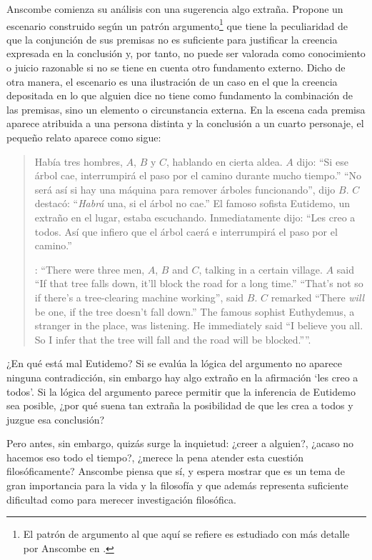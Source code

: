 Anscombe comienza su análisis con una sugerencia algo extraña. Propone un escenario construido según un patrón argumento\footnote{El patrón de argumento al que aquí se refiere es estudiado con más detalle por Anscombe en \cite{anscombe2015logic:qpa}.} que tiene la peculiaridad de que la conjunción de sus premisas no es suficiente para justificar la creencia expresada en la conclusión y, por tanto, no puede ser valorada como conocimiento o juicio razonable si no se tiene en cuenta otro fundamento externo. Dicho de otra manera, el escenario es una ilustración de un caso en el que la creencia depositada en lo que alguien dice no tiene como fundamento la combinación de las premisas, sino un elemento o circunstancia externa. En la escena cada premisa aparece atribuida a una persona distinta y la conclusión a un cuarto personaje, el pequeño relato aparece como sigue: \blockquote[{\Cite[1]{anscombe2008faith:tobelieve}}: \enquote{There were three men, $A$, $B$ and $C$, talking in a certain village. $A$ said ``If that tree falls down, it'll block the road for a long time.'' ``That's not so if there's a tree-clearing machine working'', said $B$. $C$ remarked ``There \emph{will} be one, if the tree doesn't fall down.'' The famous sophist Euthydemus, a stranger in the place, was listening. He immediately said ``I believe you all. So I infer that the tree will fall and the road will be blocked.''}.]{Había tres hombres, $A$, $B$ y $C$, hablando en cierta aldea. $A$ dijo: ``Si ese árbol cae, interrumpirá el paso por el camino durante mucho tiempo.'' ``No será así si hay una máquina para remover árboles funcionando'', dijo $B$. $C$ destacó: ``\emph{Habrá} una, si el árbol no cae.'' El famoso sofista Eutidemo, un extraño en el lugar, estaba escuchando. Inmediatamente dijo: ``Les creo a todos. Así que infiero que el árbol caerá e interrumpirá el paso por el camino.''}

¿En qué está mal Eutidemo? Si se evalúa la lógica del argumento no aparece ninguna contradicción, sin embargo hay algo extraño en la afirmación \enquote*{les creo a todos}. Si la lógica del argumento parece permitir que la inferencia de Eutidemo sea posible, ¿por qué suena tan extraña la posibilidad de que les crea a todos y juzgue esa conclusión?

Pero antes, sin embargo, quizás surge la inquietud: ¿creer a alguien?, ¿acaso no hacemos eso todo el tiempo?, ¿merece la pena atender esta cuestión filosóficamente? Anscombe piensa que sí, y espera mostrar que es un tema de gran importancia para la vida y la filosofía y que además representa suficiente dificultad como para merecer investigación filosófica.

